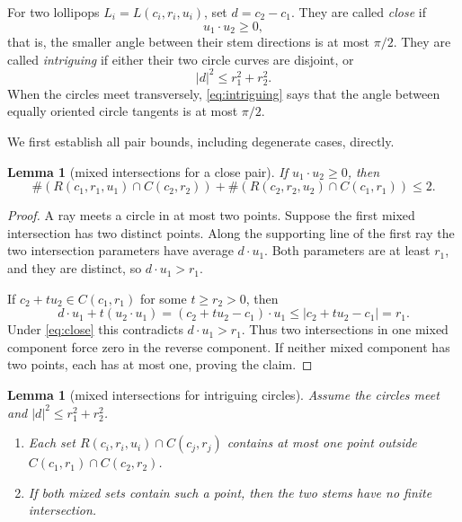 \documentclass[11pt]{article}
\theoremstyle{plain}
\newtheorem{lemma}[theorem]{Lemma}
\theoremstyle{definition}
\theoremstyle{remark}
\newcommand{\1}{\mathbf 1}
\begin{document}
For two lollipops $L_i=L(c_i,r_i,u_i)$, set $d=c_2-c_1$.
They are called \emph{close} if
\begin{equation}\label{eq:close}
 u_1\cdot u_2\geq0,
\end{equation}
that is, the smaller angle between their stem directions is at most
$\pi/2$.  They are called \emph{intriguing} if either their two circle curves
are disjoint, or
\begin{equation}\label{eq:intriguing}
 |d|^2\leq r_1^2+r_2^2.
\end{equation}
When the circles meet transversely, \eqref{eq:intriguing} says that the angle
between equally oriented circle tangents is at most $\pi/2$.

We first establish all pair bounds, including degenerate cases, directly.

\begin{lemma}[mixed intersections for a close pair]\label{lem:close-mixed}
If $u_1\cdot u_2\geq0$, then
\[
 \#(R(c_1,r_1,u_1)\cap C(c_2,r_2))
 +\#(R(c_2,r_2,u_2)\cap C(c_1,r_1))\leq2.
\]
\end{lemma}

\begin{proof}
A ray meets a circle in at most two points.  Suppose the first mixed
intersection has two distinct points.  Along the supporting line of the first
ray the two intersection parameters have average $d\cdot u_1$.  Both
parameters are at least $r_1$, and they are distinct, so
$d\cdot u_1>r_1$.

If $c_2+t u_2\in C(c_1,r_1)$ for some $t\geq r_2>0$, then
\[
 d\cdot u_1+t(u_2\cdot u_1)
 =(c_2+t u_2-c_1)\cdot u_1
 \leq |c_2+t u_2-c_1|=r_1.
\]
Under \eqref{eq:close} this contradicts $d\cdot u_1>r_1$.  Thus two
intersections in one mixed component force zero in the reverse component.
If neither mixed component has two points, each has at most one, proving the
claim.
\end{proof}

\begin{lemma}[mixed intersections for intriguing circles]\label{lem:intr-mixed}
Assume the circles meet and $|d|^2\leq r_1^2+r_2^2$.
\begin{enumerate}[label=(\roman*)]
\item Each set $R(c_i,r_i,u_i)\cap C(c_j,r_j)$ contains at most one point
outside $C(c_1,r_1)\cap C(c_2,r_2)$.
\item If both mixed sets contain such a point, then the two stems have no
finite intersection.
\end{enumerate}
\end{lemma}
\end{document}
